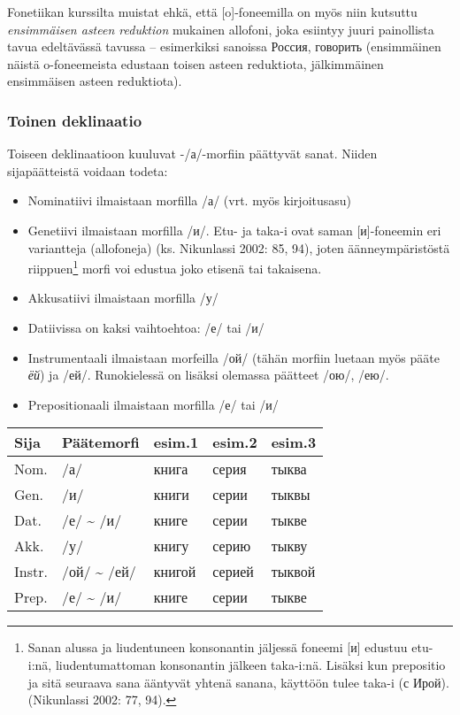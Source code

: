 \documentclass[]{scrartcl}
\providecommand{\tightlist}{%
  \setlength{\itemsep}{0pt}\setlength{\parskip}{0pt}}
\begin{document}
Fonetiikan kurssilta muistat ehkä, että {[}o{]}-foneemilla on myös niin
kutsuttu \emph{ensimmäisen asteen reduktion} mukainen allofoni, joka
esiintyy juuri painollista tavua edeltävässä tavussa -- esimerkiksi
sanoissa Россия, говорить (ensimmäinen näistä o-foneemeista edustaan
toisen asteen reduktiota, jälkimmäinen ensimmäisen asteen reduktiota).

\subsubsection{Toinen deklinaatio}\label{toinen-deklinaatio}

Toiseen deklinaatioon kuuluvat -/а/-morfiin päättyvät sanat. Niiden
sijapäätteistä voidaan todeta:

\begin{itemize}
\tightlist
\item
  Nominatiivi ilmaistaan morfilla /а/ (vrt. myös kirjoitusasu)
\item
  Genetiivi ilmaistaan morfilla /и/. Etu- ja taka-i ovat saman
  {[}и{]}-foneemin eri variantteja (allofoneja) (ks. Nikunlassi 2002:
  85, 94), joten äänneympäristöstä riippuen\footnote{Sanan alussa ja
    liudentuneen konsonantin jäljessä foneemi {[}и{]} edustuu etu-i:nä,
    liudentumattoman konsonantin jälkeen taka-i:nä. Lisäksi kun
    prepositio ja sitä seuraava sana ääntyvät yhtenä sanana, käyttöön
    tulee taka-i (с Ирой). (Nikunlassi 2002: 77, 94).} morfi voi edustua
  joko etisenä tai takaisena.
\item
  Akkusatiivi ilmaistaan morfilla /у/
\item
  Datiivissa on kaksi vaihtoehtoa: /е/ tai /и/
\item
  Instrumentaali ilmaistaan morfeilla /ой/ (tähän morfiin luetaan myös
  pääte \emph{ёй}) ja /ей/. Runokielessä on lisäksi olemassa päätteet
  /ою/, /ею/.
\item
  Prepositionaali ilmaistaan morfilla /е/ tai /и/
\end{itemize}

\begin{longtable}[c]{@{}lllll@{}}
\toprule
Sija & Päätemorfi & esim.1 & esim.2 & esim.3\tabularnewline
\midrule
\endhead
Nom. & /а/ & книга & серия & тыква\tabularnewline
Gen. & /и/ & книги & серии & тыквы\tabularnewline
Dat. & /е/ \textasciitilde{} /и/ & книге & серии & тыкве\tabularnewline
Akk. & /у/ & книгу & серию & тыкву\tabularnewline
Instr. & /ой/ \textasciitilde{} /ей/ & книгой & серией &
тыквой\tabularnewline
Prep. & /е/ \textasciitilde{} /и/ & книге & серии & тыкве\tabularnewline
\bottomrule
\end{longtable}
\end{document}
